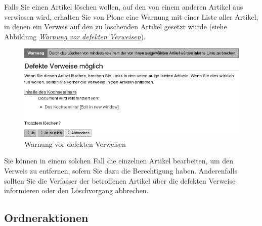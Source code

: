 \documentclass[a4paper,12pt,ngerman]{manual}
\begin{document}
Falls Sie einen Artikel löschen wollen, auf den von einem anderen Artikel aus
verwiesen wird, erhalten Sie von Plone eine Warnung mit einer Liste aller
Artikel, in denen ein Verweis auf den zu löschenden Artikel gesetzt wurde
(siehe Abbildung \hyperlink{fig-linkbruch-warnung}{\emph{Warnung vor defekten Verweisen}}).
\hypertarget{fig-linkbruch-warnung}{}\begin{figure}[htbp]
\centering

\includegraphics{linkbruch-warnung.png}
\caption{Warnung vor defekten Verweisen}\end{figure}

Sie können in einem solchen Fall die einzelnen Artikel bearbeiten, um den
Verweis zu entfernen, sofern Sie dazu die Berechtigung haben. Anderenfalls
sollten Sie die Verfasser der betroffenen Artikel über die defekten Verweise
informieren oder den Löschvorgang abbrechen.
\hypertarget{sec-ordner-aktionen}{}

\subsection{Ordneraktionen}
\end{document}
